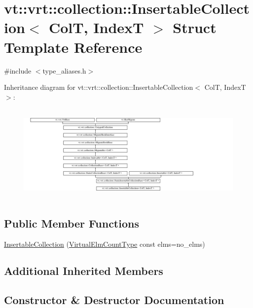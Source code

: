 \hypertarget{structvt_1_1vrt_1_1collection_1_1_insertable_collection}{}\section{vt\+:\+:vrt\+:\+:collection\+:\+:Insertable\+Collection$<$ ColT, IndexT $>$ Struct Template Reference}
\label{structvt_1_1vrt_1_1collection_1_1_insertable_collection}


{\ttfamily \#include $<$type\+\_\+aliases.\+h$>$}

Inheritance diagram for vt\+:\+:vrt\+:\+:collection\+:\+:Insertable\+Collection$<$ ColT, IndexT $>$\+:\begin{figure}[H]
\begin{center}
\leavevmode
\includegraphics[height=4.873803cm]{structvt_1_1vrt_1_1collection_1_1_insertable_collection}
\end{center}
\end{figure}
\subsection*{Public Member Functions}
\begin{DoxyCompactItemize}
\item 
\hyperlink{structvt_1_1vrt_1_1collection_1_1_insertable_collection_a1846ac1312aa63a10d7b015577d508ae}{Insertable\+Collection} (\hyperlink{namespacevt_ac115668758184050beff7a9281a2c490}{Virtual\+Elm\+Count\+Type} const elms=no\+\_\+elms)
\end{DoxyCompactItemize}
\subsection*{Additional Inherited Members}


\subsection{Constructor \& Destructor Documentation}
\mbox{\label{structvt_1_1vrt_1_1collection_1_1_insertable_collection_a1846ac1312aa63a10d7b015577d508ae}} 
